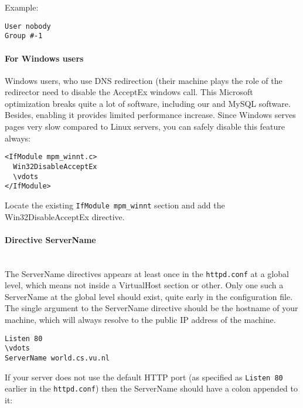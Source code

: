 \documentclass[10pt,a4paper]{article}
\makeatletter
\newenvironment{p}{\@open{P}{}}{\@close{P}}
\newenvironment{p}{}{\par}
\makeatother
\begin{document}
\begin{p}
Example:
\end{p}
\begin{Verbatim}
User nobody
Group #-1
\end{Verbatim}

\paragraph{For Windows users}

\begin{p}
Windows users, who use DNS redirection (their machine plays the role of the
redirector need to disable the AcceptEx windows call.  This Microsoft
optimization breaks quite a lot of software, including our and MySQL software.
Besides, enabling it provides limited performance increase.  Since Windows
serves pages very slow compared to Linux servers, you can safely disable this
feature always:
\end{p}

\begin{Verbatim}
<IfModule mpm_winnt.c>
  Win32DisableAcceptEx
  \vdots
</IfModule>
\end{Verbatim}

\begin{p}
Locate the existing \texttt{IfModule mpm\_winnt} section and add the
Win32DisableAcceptEx directive.
\end{p}

\paragraph{Directive \textbf{ServerName}}~\\

\begin{p}
The ServerName directives appears at least once in the \verb!httpd.conf! at a
global level, which means not inside a VirtualHost section or other.  Only one
such a ServerName at the global level should exist, quite early in the
configuration file.  The single argument to the ServerName directive should be
the hostname of your machine, which will always resolve to the public IP
address of the machine.
\end{p}

\begin{Verbatim}
Listen 80
\vdots
ServerName world.cs.vu.nl
\end{Verbatim}

\begin{p}
If your server does not use the default HTTP port (as specified as
\texttt{Listen 80} earlier in the \verb!httpd.conf!) then the ServerName should
have a colon appended to it:
\end{p}
\end{document}
